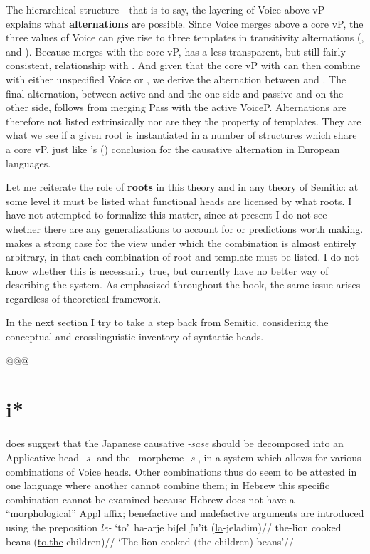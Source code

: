 The hierarchical structure---that is to say, the layering of Voice above vP---explains what \textbf{alternations} are possible. Since Voice merges above a core vP, the three values of Voice can give rise to three templates in transitivity alternations ({\tkal}, {\tnif} and {\thif}). Because {\va} merges with the core vP, {\tpie} has a less transparent, but still fairly consistent, relationship with {\tkal}. And given that the core vP with {\va} can then combine with either unspecified Voice or {\vz}, we derive the alternation between {\tpie} and {\thit}. The final alternation, between active {\tpie} and {\thif} and the one side and passive {\tpua} and {\thuf} on the other side, follows from merging Pass with the active VoiceP. Alternations are therefore not listed extrinsically nor are they the property of templates. They are what we see if a given root is instantiated in a number of structures which share a core vP, just like \citeauthor{schaefer08}'s (\citeyear{schaefer08}) conclusion for the causative alternation in European languages.

Let me reiterate the role of \textbf{roots} in this theory and in any theory of Semitic: at some level it must be listed what functional heads are licensed by what roots. I have not attempted to formalize this matter, since at present I do not see whether there are any generalizations to account for or predictions worth making. \cite{arad05} makes a strong case for the view under which the combination is almost entirely arbitrary, in that each combination of root and template must be listed. I do not know whether this is necessarily true, but currently have no better way of describing the system. As emphasized throughout the book, the same issue arises regardless of theoretical framework.

In the next section I try to take a step back from Semitic, considering the conceptual and crosslinguistic inventory of syntactic heads.

@@@
\section{i*} \label{i:i}
\cite{oseki16nyu} does suggest that the Japanese causative \emph{-sase} should be decomposed into an Applicative head \emph{-s-} and the \vd~morpheme -\emph{s}-{, in a system which allows for various combinations of Voice heads}. Other combinations thus do seem to be attested in one language where another cannot combine them; in Hebrew this {specific }combination cannot be examined because Hebrew does not have a ``morphological'' Appl affix; benefactive and malefactive arguments are introduced using the preposition \emph{le-} `to'.
\ex \begingl
    \gla ha-arje biʃel ʃu'it (\underline{la}-jeladim)//
    \glb the-lion cooked beans (\underline{to.the}-children)//
    \glft `The lion cooked (the children) beans'//
    \endgl
\xe

